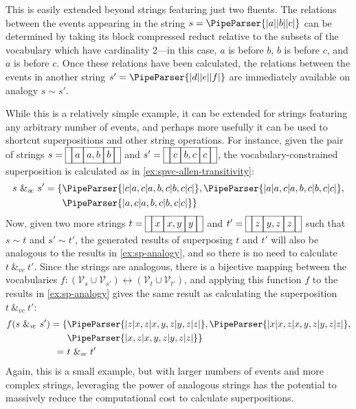 \documentclass[a4paper,12pt,leqno,twoside]{article}
\newcommand{\vph}[1]{\vphantom{#1}}
\newcommand{\ebox}[1]{\fbox{$\vph{'(),}#1$}}
\newcommand{\nbOverlaps}[2]{\ebox{#1}\ebox{#1,#2}\ebox{#2}}
\newcommand{\nbDuring}[2]{\ebox{#2}\ebox{#1,#2}\ebox{#2}}
\newcommand{\Overlaps}[2]{\ebox{}\nbOverlaps{#1}{#2}\ebox{}}
\newcommand{\During}[2]{\ebox{}\nbDuring{#1}{#2}\ebox{}}
\newcommand{\spvc}{~\&_{v\!c}~}
\newcommand{\V}{\mathcal{V}}
\newcommand{\EventString}[1]{%
	\renewcommand*{\do}[1]{\ebox{##1}}%
	\PipeParser{#1}%
}
\begin{document}
This is easily extended beyond strings featuring just two fluents. The relations between the events appearing in the string $s = \EventString{{}|a|{}|b|{}|c|{}}$ can be determined by taking its block compressed reduct relative to the subsets of the vocabulary which have cardinality 2---in this case, $a$ is before $b$, $b$ is before $c$, and $a$ is before $c$. Once these relations have been calculated, the relations between the events in another string $s' = \EventString{{}|d|{}|e|{}|f|{}}$ are immediately available on analogy $s \sim s'$.

While this is a relatively simple example, it can be extended for strings featuring any arbitrary number of events, and perhaps more usefully it can be used to shortcut superpositions and other string operations. For instance, given the pair of strings $s = \Overlaps{a}{b}$ and $s' = \During{b}{c}$, the vocabulary-constrained superposition is calculated as in \cref{ex:spvc-allen-transitivity}:
\begin{align}\label{ex:sp-analogy}
	s \spvc s' = \{&\EventString{{}|c|a,c|a,b,c|b,c|c|{}}, \EventString{{}|a|a,c|a,b,c|b,c|c|{}},\\
	&\EventString{{}|a,c|a,b,c|b,c|c|{}}\}\notag
\end{align}
Now, given two more strings $t = \Overlaps{x}{y}$ and $t' = \During{y}{z}$ such that $s \sim t$ and $s' \sim t'$, the generated results of superposing $t$ and $t'$ will also be analogous to the results in \cref{ex:sp-analogy}, and so there is no need to calculate $t \spvc t'$. Since the strings are analogous, there is a bijective mapping between the vocabularies $f: (\V_{s} \cup \V_{s'}) \leftrightarrow (\V_{t} \cup \V_{t'})$, and applying this function $f$ to the results in \cref{ex:sp-analogy} gives the same result as calculating the superposition $t \spvc t'$:
\begin{align}\label{ex:sp-analogy-equal}
	f(s \spvc s') = \{&\EventString{{}|z|x,z|x,y,z|y,z|z|{}}, \EventString{{}|x|x,z|x,y,z|y,z|z|{}},\\
	&\EventString{{}|x,z|x,y,z|y,z|z|{}}\}\notag\\
	=~&t \spvc t'
\end{align}
Again, this is a small example, but with larger numbers of events and more complex strings, leveraging the power of analogous strings has the potential to massively reduce the computational cost to calculate superpositions.
\end{document}
